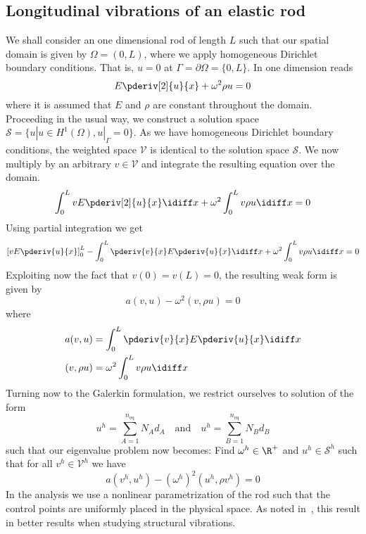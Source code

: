 \subsection{Longitudinal vibrations of an elastic rod}
\label{subse:longVibElRod}
We shall consider an one dimensional rod of length $L$ such that our spatial domain is given by $\Omega = (0, L)$, where we apply homogeneous Dirichlet boundary conditions. That is, $u=0$ at $\Gamma = \partial\Omega = \{0, L\}$. In one dimension  reads
\begin{equation}\label{Eq2:elastic1Drod}
	E\pderiv[2]{u}{x} + \omega^2 \rho u = 0
\end{equation}
where it is assumed that $E$ and $\rho$ are constant throughout the domain. Proceeding in the usual way, we construct a solution space $\mathcal{S}=\{u|u\in H^1(\Omega), u|_\Gamma = 0\}$. As we have homogeneous Dirichlet boundary conditions, the weighted space $\mathcal{V}$ is identical to the solution space $\mathcal{S}$. We now multiply  by an arbitrary $v\in \mathcal{V}$ and integrate the resulting equation over the domain.
\begin{equation*}
	\int_0^L  vE\pderiv[2]{u}{x} \idiff x + \omega^2\int_0^L v\rho u \idiff x = 0
\end{equation*}
Using partial integration we get
\begin{equation*}
	\left[vE\pderiv{u}{x} \right]_0^L - \int_0^L \pderiv{v}{x}E \pderiv{u}{x} \idiff x+ \omega^2\int_0^L v \rho u  \idiff x = 0
\end{equation*}
Exploiting now the fact that $v(0) = v(L) = 0$, the resulting weak form is given by
\begin{equation*}
	a(v,u) -\omega^2 (v,\rho u) = 0
\end{equation*}
where
\begin{align*}
	a(v,u) &= \int_0^L  \pderiv{v}{x} E\pderiv{u}{x} \idiff x\\
	( v,\rho u) &= \omega^2\int_0^L  v\rho u \idiff x
\end{align*}
Turning now to the Galerkin formulation, we restrict ourselves to solution of the form
\begin{equation*}
	u^h = \sum_{A = 1}^{n_{\mathrm{eq}}} N_A d_A\quad\text{and}\quad u^h = \sum_{B = 1}^{n_{\mathrm{eq}}} N_B d_B
\end{equation*}
such that our eigenvalue problem now becomes: Find $\omega^h\in\R^+$ and $u^h\in\mathcal{S}^h$ such that for all $v^h\in\mathcal{V}^h$ we have
\begin{equation*}
	a(v^h,u^h) -(\omega^h)^2 (u^h,\rho v^h) = 0
\end{equation*}
In the analysis we use a nonlinear parametrization of the rod such that the control points are uniformly placed in the physical space. As noted in~\cite{Cottrell2009iat}, this result in better results when studying structural vibrations. 

